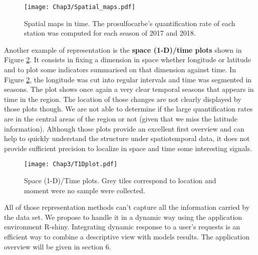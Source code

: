\begin{figure}[ht]
    \centering
    \texttt{[image: Chap3/Spatial\_maps.pdf]}
    \caption{Spatial maps in time. The prosulfocarbe's quantification rate of each station was computed for each season of 2017 and 2018.}
    \label{fig:spa_ex}
\end{figure}

Another example of representation is the \textbf{space (1-D)/time plots} shown in Figure \ref{fig:S1Dplot}. It consists in fixing a dimension in space whether longitude or latitude and to plot some indicators summarised on that dimension against time. In Figure \ref{fig:S1Dplot}, the longitude was cut into regular intervals and time was segmented in seasons. The plot shows once again a very clear temporal seasons that appears in time in the region. The location of those changes are not clearly displayed by those plots though. We are not able to determine if the large quantification rates are in the central areas of the region or not (given that we miss the latitude information). Although those plots provide an excellent first overview and can help to quickly understand the structure under spatiotemporal data, it does not provide sufficient precision to localize in space and time some interesting signals.    

\begin{figure}[ht]
    \centering
    \texttt{[image: Chap3/T1Dplot.pdf]}
    \caption{Space (1-D)/Time plots. Grey tiles correspond to location and moment were no sample were collected.}
    \label{fig:S1Dplot}
\end{figure}

All of those representation methods can't capture all the information carried by the data set. We propose to handle it in a dynamic way using the application environment R-shiny. Integrating dynamic response to a user's requests is an efficient way to combine a descriptive view with models results. The application overview will be given in section 6.